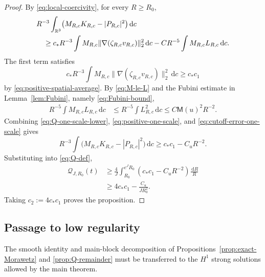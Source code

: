 \documentclass{interact}
\numberwithin{equation}{section}
\theoremstyle{plain}
\theoremstyle{definition}
\theoremstyle{remark}
\newcommand{\R}{\mathbb R}
\newcommand{\M}{\mathsf M}
\newcommand{\dd}{\,\mathrm d}
\begin{document}
\begin{proof}
By \eqref{eq:local-coercivity}, for every $R\ge R_0$,
\begin{align}
 &R^{-3}\int_{\R^3}
 \bigl(M_{R,c}K_{R,c}-|P_{R,c}|^2\bigr)\dd c
 \notag\\
 &\quad\ge c_*R^{-3}\int M_{R,c}
 \|\nabla(\zeta_{R,c}v_{R,c})\|_2^2\dd c
 -CR^{-5}\int M_{R,c}L_{R,c}\dd c.
 \label{eq:Q-one-scale-lower}
\end{align}
The first term satisfies
\begin{equation}\label{eq:positive-one-scale}
 c_*R^{-3}\int M_{R,c}
 \|\nabla(\zeta_{R,c}v_{R,c})\|_2^2\dd c
 \ge c_*c_1
\end{equation}
by \eqref{eq:positive-spatial-average}. By \eqref{eq:M-le-L} and the Fubini estimate in Lemma~\ref{lem:Fubini}, namely \eqref{eq:Fubini-bound},
\begin{align}
 R^{-5}\int M_{R,c}L_{R,c}\dd c
 &\le R^{-5}\int L_{R,c}^2\dd c
 \le C\M(u)^2R^{-2}.
 \label{eq:cutoff-error-one-scale}
\end{align}
Combining \eqref{eq:Q-one-scale-lower}, \eqref{eq:positive-one-scale}, and \eqref{eq:cutoff-error-one-scale} gives
\[
 R^{-3}\int
 \bigl(M_{R,c}K_{R,c}-|P_{R,c}|^2\bigr)\dd c
 \ge c_*c_1-C_uR^{-2}.
\]
Substituting into \eqref{eq:Q-def},
\begin{align*}
 \mathcal Q_{J,R_0}(t)
 &\ge\frac4J\int_{R_0}^{e^JR_0}
 \left(c_*c_1-C_uR^{-2}\right)\frac{\dd R}{R}\\
 &\ge4c_*c_1-\frac{C_u}{JR_0^2}.
\end{align*}
Taking $c_2:=4c_*c_1$ proves the proposition.
\end{proof}

\subsection{Passage to low regularity}

The smooth identity and main-block decomposition of Propositions~\ref{prop:exact-Morawetz} and \ref{prop:Q-remainder} must be transferred to the $H^1$ strong solutions allowed by the main theorem.
\end{document}
